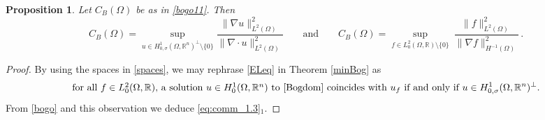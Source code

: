 \documentclass[11pt]{article}
\theoremstyle{plain}
\newtheorem{proposition}[theorem]{Proposition}
\theoremstyle{definition}
\numberwithin{equation}{section}
\newcommand{\R}{\mathbb{R}}
\begin{document}
\begin{proposition}\label{lem:comm_1.6}
Let $C_B(\Omega)$ be as in \eqref{bogo11}. Then
\begin{equation}\label{eq:comm_1.3}
C_B(\Omega)=\sup_{u\in H^1_{0,\sigma}(\Omega,\R^n)^\perp\setminus \{0\}} \frac{\|\nabla u\|_{L^2(\Omega)}^2}{\| \nabla \cdot u\|_{L^2(\Omega)}^2}\qquad\mbox{and}\qquad
C_B(\Omega)=\sup_{f\in L^2_0(\Omega,\R)\setminus \{0\}}\ \frac{\|  f\|_{L^2(\Omega)}^2}{\| \nabla f\|_{H^{-1}(\Omega)}^2} \, .
\end{equation}
\end{proposition}
\noindent
\begin{proof} By using the spaces in \eqref{spaces}, we may rephrase \eqref{ELeq} in Theorem \ref{minBog} as
$$
\mbox{for all $f\in L^2_0 (\Omega,\R)$, a solution $u\in H^1_{0}(\Omega,\R^n)$ to \eqref{Bogdom} coincides with $u_f$ if and only if }
u\in H^1_{0,\sigma}(\Omega,\R^n)^\perp.
$$
From \eqref{bogo} and this observation we deduce \eqref{eq:comm_1.3}$_1$.


\end{proof}
\end{document}
